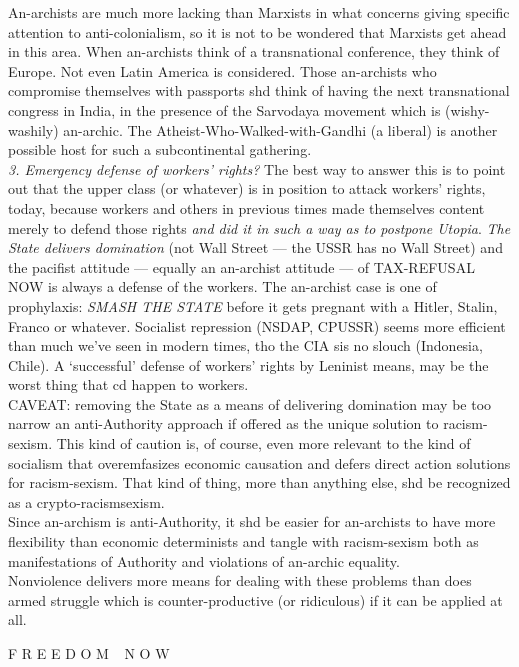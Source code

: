 \documentclass[12pt, onecolumn, letterpaper, oneside]{book}
\begin{document}
An-archists are much more lacking than Marxists in what concerns giving specific attention to anti-colonialism, so it is not to be wondered that Marxists get ahead in this area. When an-archists think of a transnational conference, they think of Europe. Not even Latin America is considered. Those an-archists who compromise themselves with passports shd think of having the next transnational congress in India, in the presence of the Sarvodaya movement which is (wishy-washily) an-archic. The Atheist-Who-Walked-with-Gandhi (a liberal) is another possible host for such a subcontinental gathering.\\
\emph{3. Emergency defense of workers' rights?} The best way to answer this is to point out that the upper class (or whatever) is in position to attack workers' rights, today, because workers and others in previous times made themselves content merely to defend those rights \emph{and did it in such a way as to postpone Utopia}. \emph{The State delivers domination} (not Wall Street --- the USSR has no Wall Street) and the pacifist attitude --- equally an an-archist attitude --- of TAX-REFUSAL NOW is always a defense of the workers. The an-archist case is one of prophylaxis: \emph{SMASH THE STATE} before it gets pregnant with a Hitler, Stalin, Franco or whatever. Socialist repression (NSDAP, CPUSSR) seems more efficient than much we've seen in modern times, tho the CIA sis no slouch (Indonesia, Chile). A `successful' defense of workers' rights by Leninist means, may be the worst thing that cd happen to workers.\\
CAVEAT: removing the State as a means of delivering domination may be too narrow an anti-Authority approach if offered as the unique solution to racism-sexism. This kind of caution is, of course, even more relevant to the kind of socialism that overemfasizes economic causation and defers direct action solutions for racism-sexism. That kind of thing, more than anything else, shd be recognized as a crypto-racismsexism.\\
Since an-archism is anti-Authority, it shd be easier for an-archists to have more flexibility than economic determinists and tangle with racism-sexism both as manifestations of Authority and violations of an-archic equality.\\
Nonviolence delivers more means for dealing with these problems than does armed struggle which is counter-productive (or ridiculous) if it can be applied at all.
\begin{center}
F R E E D O M $\;\,$ N O W
\end{center}
\end{document}
